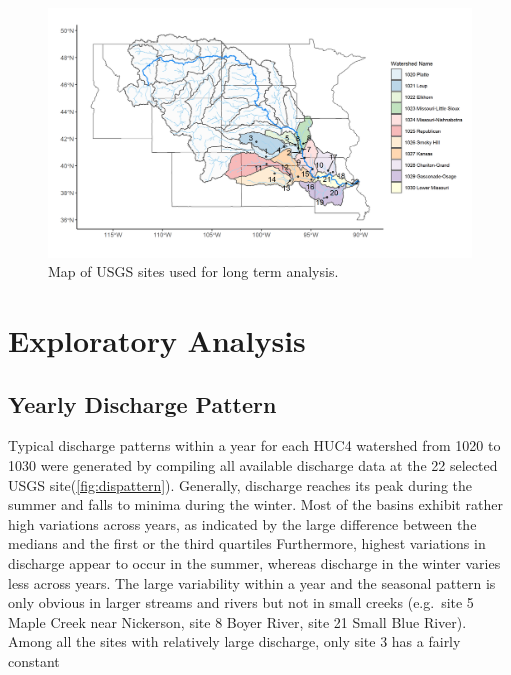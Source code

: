 \documentclass[12pt,]{article}
\makeatletter
\def\maxwidth{\ifdim\Gin@nat@width>\linewidth\linewidth\else\Gin@nat@width\fi}
\makeatother
\begin{document}
\begin{figure}
\includegraphics[width=\maxwidth]{../Figures/site_map} \caption{\label{fig:sitemap} Map of USGS sites used for long term analysis.}\label{fig:sitemap}
\end{figure}

\newpage

\hypertarget{exploratory-analysis}{%
\section{Exploratory Analysis}\label{exploratory-analysis}}

\hypertarget{yearly-discharge-pattern}{%
\subsection{Yearly Discharge Pattern}\label{yearly-discharge-pattern}}

Typical discharge patterns within a year for each HUC4 watershed from
1020 to 1030 were generated by compiling all available discharge data at
the 22 selected USGS site(\autoref{fig:dispattern}). Generally,
discharge reaches its peak during the summer and falls to minima during
the winter. Most of the basins exhibit rather high variations across
years, as indicated by the large difference between the medians and the
first or the third quartiles Furthermore, highest variations in
discharge appear to occur in the summer, whereas discharge in the winter
varies less across years. The large variability within a year and the
seasonal pattern is only obvious in larger streams and rivers but not in
small creeks (e.g.~site 5 Maple Creek near Nickerson, site 8 Boyer
River, site 21 Small Blue River). Among all the sites with relatively
large discharge, only site 3 has a fairly constant
\end{document}
